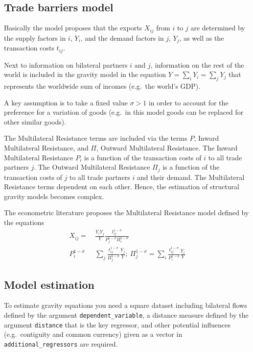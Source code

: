\documentclass[12pt,reqno,oneside,pdftex]{formato-puc/puctesis} %
\begin{document}
\hypertarget{trade-barriers-model}{%
\subsection{Trade barriers model}\label{trade-barriers-model}}

Basically the model proposes that the exports \(X_{ij}\) from \(i\) to
\(j\) are determined by the supply factors in \(i\), \(Y_{i}\), and the
demand factors in \(j\), \(Y_{j}\), as well as the transaction costs
\(t_{ij}\).

Next to information on bilateral partners \(i\) and \(j\), information
on the rest of the world is included in the gravity model in the
equation \(Y=\sum_{i} Y_{i}= \sum_{j} Y_{j}\) that represents the
worldwide sum of incomes (e.g.~the world's GDP).

A key assumption is to take a fixed value \(\sigma > 1\) in order to
account for the preference for a variation of goods (e.g.~in this model
goods can be replaced for other similar goods).

The Multilateral Resistance terms are included via the terms \(P\),
Inward Multilateral Resistance, and \(\Pi\), Outward Multilateral
Resistance. The Inward Multilateral Resistance \(P_i\) is a function of
the transaction costs of \(i\) to all trade partners \(j\). The Outward
Multilateral Resistance \(\Pi_{j}\) is a function of the transaction
costs of \(j\) to all trade partners \(i\) and their demand. The
Multilateral Resistance terms dependent on each other. Hence, the
estimation of structural gravity models becomes complex.

The econometric literature proposes the Multilateral Resistance model
defined by the equations \begin{align*}
X_{ij} =& \frac{Y_{i}Y_{j}}{Y}\frac{t_{ij}^{1-\sigma}}{P_{j}^{1-\sigma}\Pi_{i}^{1-\sigma}}\\
P_{i}^{1-\sigma} \text{ }& \sum_{j}\frac{t_{ij}^{1-\sigma}}{\Pi_{j}^{1-\sigma}}\frac{Y_{j}}{Y};\:\Pi_{j}^{1-\sigma}=\sum_{i}\frac{t_{ij}^{1-\sigma}}{P_{i}^{1-\sigma}}\frac{Y_{i}}{Y}
\end{align*}

\hypertarget{model-estimation}{%
\subsection{Model estimation}\label{model-estimation}}

To estimate gravity equations you need a square dataset including
bilateral flows defined by the argument \texttt{dependent\_variable}, a
distance measure defined by the argument \texttt{distance} that is the
key regressor, and other potential influences (e.g.~contiguity and
common currency) given as a vector in \texttt{additional\_regressors}
are required.
\end{document}
